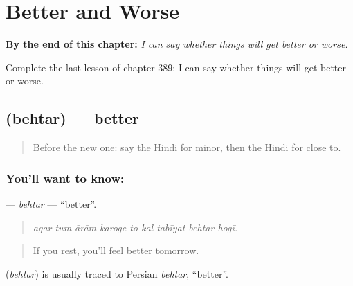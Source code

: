 
\chapter{Better and Worse}
\label{ch:hi-better-and-worse}

\begin{chapteropening}
\textbf{By the end of this chapter:} \emph{I can say whether things will get better or worse.}

Complete the last lesson of chapter 389: I can say whether things will get better or worse.
\end{chapteropening}

\section[\texorpdfstring{\hi{बेहतर} (behtar)}{बेहतर (behtar)}]{ (behtar) — better}

\label{lesson:HI-C389-behtar}



\begin{quote}
Before the new one: say the Hindi for minor, then the Hindi for close to.
\end{quote}

\subsection*{You'll want to know: }
\textbf{} — \emph{behtar} — \textquotedblleft{}better\textquotedblright{}.

\begin{quote}
        
\end{quote}

\begin{quote}
\emph{agar tum ārām karoge to kal tabīyat behtar hogī.}
\end{quote}

\begin{quote}
If you rest, you'll feel better tomorrow.
\end{quote}

\begin{cousinweb}
\textbf{} (\emph{behtar}) is usually traced to Persian \emph{behtar}, \textquotedblleft{}better\textquotedblright{}.
\end{cousinweb}

